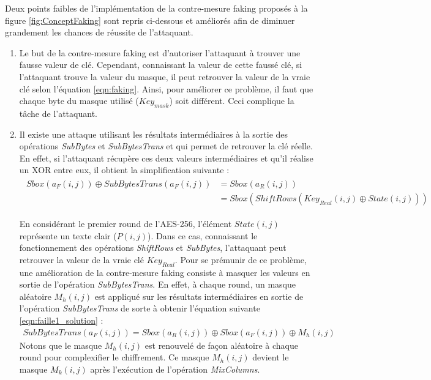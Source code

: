 \documentclass[oneside]{book}
\begin{document}
Deux points faibles de l'implémentation de la contre-mesure faking proposés à la figure \ref{fig:ConceptFaking} sont repris ci-dessous et améliorés afin de diminuer grandement les chances de réussite de l'attaquant.
\begin{enumerate}
\item Le but de la contre-mesure faking est d'autoriser l'attaquant à trouver une fausse valeur de clé. Cependant, connaissant la valeur de cette faussé clé, si l'attaquant trouve la valeur du masque, il peut retrouver la valeur de la vraie clé selon l'équation \ref{eqn:faking}. Ainsi, pour améliorer ce problème, il faut que chaque byte du masque utilisé ($Key_{mask}$) soit différent. Ceci complique la tâche de l'attaquant.
\item Il existe une attaque utilisant les résultats intermédiaires à la sortie des opérations \textit{SubBytes} et \textit{SubBytesTrans} et qui permet de retrouver la clé réelle. En effet, si l'attaquant récupère ces deux valeurs intermédiaires et qu'il réalise un XOR entre eux, il obtient la simplification suivante : 
\begin{gather}
\begin{align*}
        Sbox(a_{F}(i,j)) \oplus SubBytesTrans(a_{F}(i,j)) &= Sbox(a_{R}(i,j))  \\
            &=Sbox(ShiftRows(Key_{Real}(i,j) \oplus State(i,j)))  
\end{align*}
\label{eqn:faille1}
\end{gather}

En considérant le premier round de l'AES-256, l'élément $State(i,j)$ représente un texte clair ($P(i,j)$). Dans ce cas, connaissant le fonctionnement des opérations \textit{ShiftRows} et \textit{SubBytes}, l'attaquant peut retrouver la valeur de la vraie clé $Key_{Real}$. Pour se prémunir de ce problème, une amélioration de la contre-mesure faking consiste à masquer les valeurs en sortie de l'opération \textit{SubBytesTrans}. En effet, à chaque round, un masque aléatoire $M_{h}(i,j)$ est appliqué sur les résultats intermédiaires en sortie de l'opération \textit{SubBytesTrans} de sorte à obtenir l'équation suivante \ref{eqn:faille1_solution} : 
\begin{gather}
	SubBytesTrans(a_{F}(i,j)) = Sbox(a_{R}(i,j))  \oplus Sbox(a_{F}(i,j)) \oplus M_{h}(i,j) \label{eqn:faille1_solution}
\end{gather}
Notons que le masque $M_{h}(i,j)$ est renouvelé de façon aléatoire à chaque round pour complexifier le chiffrement. Ce masque $M_{h}(i,j)$ devient le masque $M_{k}(i,j)$ après l'exécution de l'opération \textit{MixColumns}. 
\end{enumerate}
\end{document}
